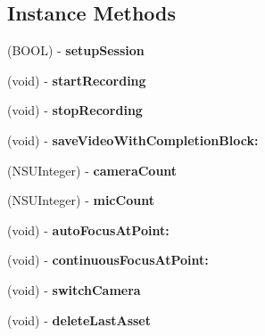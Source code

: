 \subsection*{Instance Methods}
\begin{DoxyCompactItemize}
\item 
\hypertarget{interface_capture_manager_a4eb8c7a4aefc4a1eaea10a5deb43dce2}{}(B\+O\+O\+L) -\/ {\bfseries setup\+Session}\label{interface_capture_manager_a4eb8c7a4aefc4a1eaea10a5deb43dce2}

\item 
\hypertarget{interface_capture_manager_a48a5d05e187d6c4e0f0f06eaffb034dc}{}(void) -\/ {\bfseries start\+Recording}\label{interface_capture_manager_a48a5d05e187d6c4e0f0f06eaffb034dc}

\item 
\hypertarget{interface_capture_manager_af0b4f8bddde4d18fc53e604eaef3e7df}{}(void) -\/ {\bfseries stop\+Recording}\label{interface_capture_manager_af0b4f8bddde4d18fc53e604eaef3e7df}

\item 
\hypertarget{interface_capture_manager_a7694f7e1639770571ed89075335cc902}{}(void) -\/ {\bfseries save\+Video\+With\+Completion\+Block\+:}\label{interface_capture_manager_a7694f7e1639770571ed89075335cc902}

\item 
\hypertarget{interface_capture_manager_a1e859e9b458406275fb4ed7cffdacfb5}{}(N\+S\+U\+Integer) -\/ {\bfseries camera\+Count}\label{interface_capture_manager_a1e859e9b458406275fb4ed7cffdacfb5}

\item 
\hypertarget{interface_capture_manager_aea0e89955f6b0dfe80c98fabcf430455}{}(N\+S\+U\+Integer) -\/ {\bfseries mic\+Count}\label{interface_capture_manager_aea0e89955f6b0dfe80c98fabcf430455}

\item 
\hypertarget{interface_capture_manager_a8395e9ae07c1d731491dc247fa350ea7}{}(void) -\/ {\bfseries auto\+Focus\+At\+Point\+:}\label{interface_capture_manager_a8395e9ae07c1d731491dc247fa350ea7}

\item 
\hypertarget{interface_capture_manager_ac568ec74930a33bde143121329c11fc3}{}(void) -\/ {\bfseries continuous\+Focus\+At\+Point\+:}\label{interface_capture_manager_ac568ec74930a33bde143121329c11fc3}

\item 
\hypertarget{interface_capture_manager_a3f19de7378a660feb3253b398d5f5f3c}{}(void) -\/ {\bfseries switch\+Camera}\label{interface_capture_manager_a3f19de7378a660feb3253b398d5f5f3c}

\item 
\hypertarget{interface_capture_manager_aba8b1ac413986b6ac88d1888e0b4b418}{}(void) -\/ {\bfseries delete\+Last\+Asset}\label{interface_capture_manager_aba8b1ac413986b6ac88d1888e0b4b418}

\end{DoxyCompactItemize}
